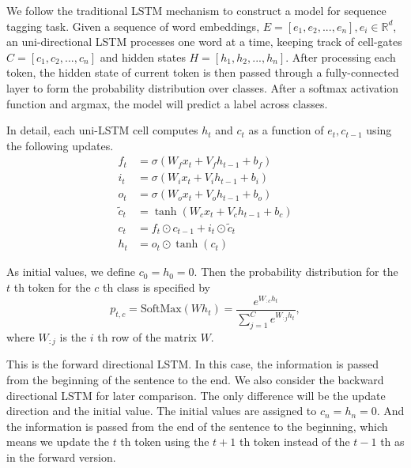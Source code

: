 \documentclass{article}
\begin{document}
We follow the traditional LSTM mechanism to construct a model for sequence tagging task. Given a sequence of word embeddings, $E = [e_1, e_2, ... , e_n], e_i \in \mathbb{R}^d$, an uni-directional LSTM processes one word at a time, keeping track of cell-gates $C = [c_1, c_2, ... , c_n]$ and hidden states $H = [h_1, h_2, ... , h_n]$. After processing each token, the hidden state of current token is then passed through a fully-connected layer to form the probability distribution over classes. After a softmax activation function and argmax, the model will predict a label across classes.

In detail, each uni-LSTM cell computes $h_t$ and $c_t$ as a function of $e_t, c_{t-1}$ using the following updates. 
\begin{align} 
f_t & = \sigma(W_f x_t + V_f h_{t - 1} + b_f) \label{eq:1f}\\
i_t & = \sigma(W_i x_t + V_i h_{t - 1} + b_i) \label{eq:1i}\\
o_t & = \sigma(W_o x_t + V_o h_{t - 1} + b_o) \label{eq:1o}\\
\tilde{c}_t & = \tanh(W_c x_t + V_c h_{t - 1} + b_c) \\
c_t & = f_t \odot c_{t - 1} + i_t \odot \tilde{c}_t \label{eq:1c}\\
h_t & = o_t \odot \tanh(c_t)\label{eq:1h}
\end{align}

As initial values, we define $c_0=h_0=0$. 
Then the probability distribution for the $t$ th token for the $c$ th class is specified by 
\begin{equation}
p_{t, c} = \text{SoftMax}(W h_t) = \frac{e^{W_{:c} h_t}}{\sum_{j = 1} ^ C e^{W_{:j} h_t}},
\end{equation}
where $W_{:j}$ is the $i$ th row of the matrix $W$.

This is the forward directional LSTM. In this case, the information is passed from the beginning of the sentence to the end. We also consider the backward directional LSTM for later comparison. The only difference will be the update direction and the initial value. The initial values are assigned to $c_n=h_n=0$. And the information is passed from the end of the sentence to the beginning, which means we update the $t$ th token using the $t+1$ th token instead of the $t-1$ th as in the forward version.
\end{document}
